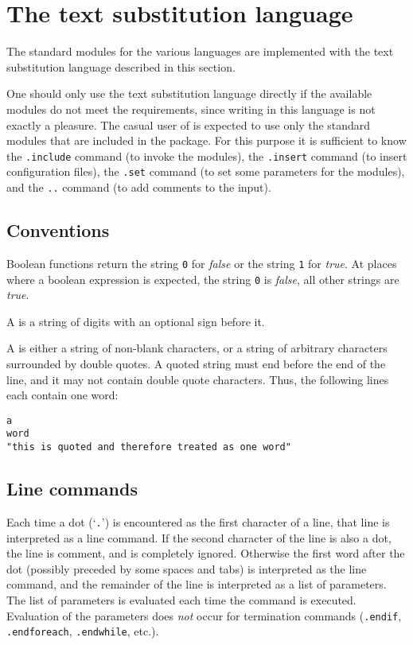 \chapter{The text substitution language}
\label{s.tm}
The standard modules for the various languages are implemented
with the text substitution language described in this section.

One should only use the text substitution language directly if the available
modules do not meet the requirements,
since writing in this language is not exactly a pleasure.
The casual user of {\Tm} is expected to use only the standard modules that
are included in the {\Tm} package.
For this purpose it is sufficient to know
the \texttt{.include} command (to invoke the modules),
the \texttt{.insert} command (to insert configuration files),
the \texttt{.set} command (to set some parameters for the modules),
and the \texttt{..} command (to add comments to the {\Tm} input).
\section{Conventions}
Boolean functions return the string \texttt{0} for
\textit{false} or the string \texttt{1} for \textit{true}.
At places where a boolean expression is expected,
the string \texttt{0} is \textit{false},
all other strings are \textit{true}.

A  is a string of digits with an optional sign before it.

A  is either a string of non-blank characters, or a string of
arbitrary characters surrounded by double quotes. A quoted string
must end before the end of the line, and it may not contain
double quote characters.
Thus,
the following lines each contain one word:
\begin{showfile}
\begin{verbatim}
a
word
"this is quoted and therefore treated as one word"
\end{verbatim}
\end{showfile}
\section{Line commands}
Each time a dot (`\texttt{.}') is encountered as the first character of a line,
that line is interpreted as a {\Tm} line command.
If the second character of the line is also a dot,
the line is comment, and is completely ignored.
Otherwise the first word after the dot
(possibly preceded by some spaces and tabs)
is interpreted as the line command,
and the remainder of the line is interpreted as a list of parameters.
The list of parameters is evaluated each time the command is executed.
Evaluation of the parameters does \emph{not} occur for termination commands
(\texttt{.endif}, \texttt{.endforeach}, \texttt{.endwhile}, etc.).

